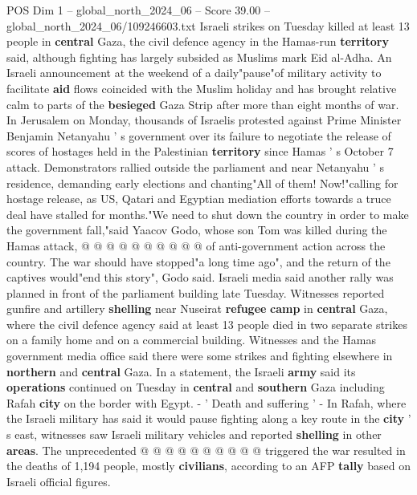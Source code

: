 \begin{textsample}{POS Dim 1 – global\_north\_2024\_06 – Score 39.00 – global\_north\_2024\_06/109246603.txt}  \label{ex:f1_pos_237}
Israeli strikes on Tuesday killed at least 13 people in \textbf{central} Gaza, the civil defence agency in the Hamas-run \textbf{territory} said, although fighting has largely subsided as Muslims mark Eid al-Adha.
An Israeli announcement at the weekend of a daily"pause"of military activity to facilitate \textbf{aid} flows coincided with the Muslim holiday and has brought relative calm to parts of the \textbf{besieged} Gaza Strip after more than eight months of war.
In Jerusalem on Monday, thousands of Israelis protested against Prime Minister Benjamin Netanyahu ' s government over its failure to negotiate the release of scores of hostages held in the Palestinian \textbf{territory} since Hamas ' s October 7 attack.
Demonstrators rallied outside the parliament and near Netanyahu ' s residence, demanding early elections and chanting"All of them!
Now!"calling for hostage release, as US, Qatari and Egyptian mediation efforts towards a truce deal have stalled for months."We need to shut down the country in order to make the government fall,"said Yaacov Godo, whose son Tom was killed during the Hamas attack, @ @ @ @ @ @ @ @ @ @ of anti-government action across the country.
The war should have stopped"a long time ago", and the return of the captives would"end this story", Godo said.
Israeli media said another rally was planned in front of the parliament building late Tuesday.
Witnesses reported gunfire and artillery \textbf{shelling} near Nuseirat \textbf{refugee} \textbf{camp} in \textbf{central} Gaza, where the civil defence agency said at least 13 people died in two separate strikes on a family home and on a commercial building.
Witnesses and the Hamas government media office said there were some strikes and fighting elsewhere in \textbf{northern} and \textbf{central} Gaza.
In a statement, the Israeli \textbf{army} said its \textbf{operations} continued on Tuesday in \textbf{central} and \textbf{southern} Gaza including Rafah \textbf{city} on the border with Egypt. - ' Death and suffering ' - In Rafah, where the Israeli military has said it would pause fighting along a key route in the \textbf{city} ' s east, witnesses saw Israeli military vehicles and reported \textbf{shelling} in other \textbf{areas}.
The unprecedented @ @ @ @ @ @ @ @ @ @ triggered the war resulted in the deaths of 1,194 people, mostly \textbf{civilians}, according to an AFP \textbf{tally} based on Israeli official figures.

\end{textsample}
